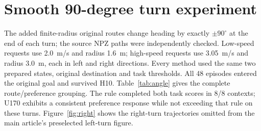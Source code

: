 \documentclass[11pt,a4paper]{article}
\begin{document}
\section{Smooth 90-degree turn experiment}
The added finite-radius original routes change heading by exactly $\pm90^\circ$ at the end of each turn; the source NPZ paths were independently checked. Low-speed requests use 2.0~m/s and radius 1.6~m; high-speed requests use 3.05~m/s and radius 3.0~m, each in left and right directions. Every method used the same two prepared states, original destination and task thresholds. All 48 episodes entered the original goal and survived H10. Table~\ref{tab:angle} gives the complete route/preference grouping. The rule completed both task scores in 8/8 contexts; U170 exhibits a consistent preference response while not exceeding that rule on these turns. Figure~\ref{fig:right} shows the right-turn trajectories omitted from the main article's preselected left-turn figure.
\end{document}
